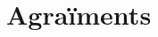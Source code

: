 \documentclass[../main.tex]{subfiles}
\begin{document}

\chapter*{Agraïments}\label{ch:akw}


\end{document}
